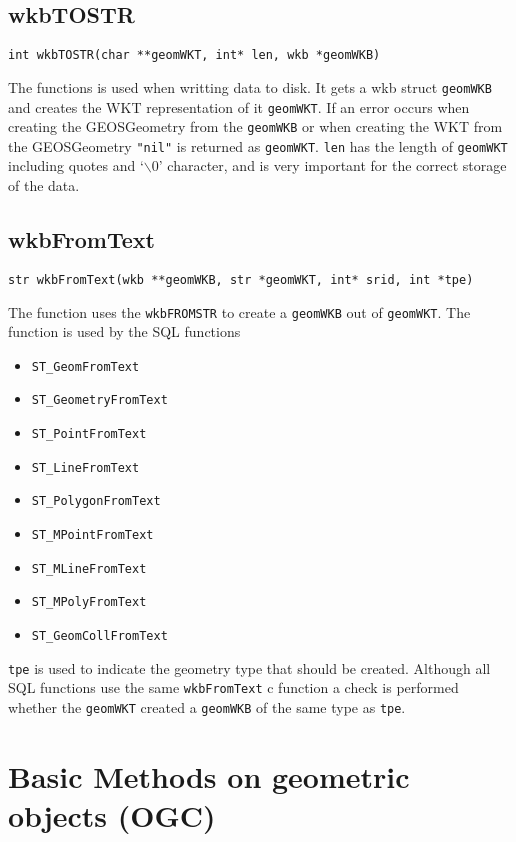\documentclass{article}
\begin{document}
\subsection{wkbTOSTR}

{\tt int wkbTOSTR(char **geomWKT, int* len, wkb *geomWKB)}

\vspace{10pt}

\noindent
The functions is used when writting data to disk. It gets a wkb struct {\tt geomWKB} and creates
the WKT representation of it {\tt geomWKT}. If an error occurs when creating the GEOSGeometry from 
the {\tt geomWKB} or when creating the WKT from the GEOSGeometry {\tt "nil"} is returned as 
{\tt geomWKT}. {\tt *len} has the length of {\tt geomWKT} including quotes and `$\backslash$0' 
character, and is very important for the correct storage of the data.


\subsection{wkbFromText}

{\tt str wkbFromText(wkb **geomWKB, str *geomWKT, int* srid, int *tpe)}

\vspace{10pt}

\noindent
The function uses the {\tt wkbFROMSTR} to create a {\tt geomWKB} out of {\tt geomWKT}.
The function is used by the SQL functions
\begin{itemize}
\item {\tt ST\_GeomFromText}
\item {\tt ST\_GeometryFromText}
\item {\tt ST\_PointFromText}
\item {\tt ST\_LineFromText}
\item {\tt ST\_PolygonFromText}
\item {\tt ST\_MPointFromText}
\item {\tt ST\_MLineFromText}
\item {\tt ST\_MPolyFromText}
\item {\tt ST\_GeomCollFromText}
\end{itemize}
{\tt *tpe} is used to indicate the geometry type that should be created. Although all SQL
functions use the same {\tt wkbFromText} c function a check is performed whether the 
{\tt geomWKT} created a {\tt geomWKB} of the same type as {\tt *tpe}.


\section{Basic Methods on geometric objects (OGC)}
\end{document}
